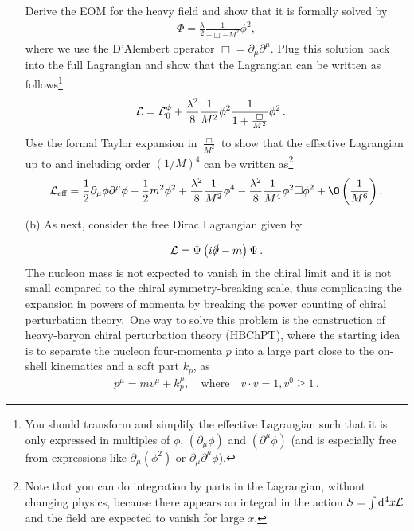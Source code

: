 \documentclass[11pt]{latex/exercise}
\begin{document}
\begin{itemize}
          Derive the EOM for the heavy field and show that it is formally solved by
          \begin{gather}
              \Phi=\frac{\lambda}{2}\frac{1}{-\Box -M^2}\phi^2,
              \label{eq:formal_sol}
          \end{gather}
          where we use the D'Alembert operator $\Box=\partial_{\mu}\partial^{\mu}$.
          Plug this solution back into the full Lagrangian and show that the Lagrangian can be written as follows\footnote{You should transform and simplify the effective Lagrangian such that it is only expressed in multiples of $\phi$, $(\partial_{\mu}\phi)$ and $(\partial^{\mu}\phi)$
              (and is especially free from expressions like $\partial_{\mu}(\phi^2)$ or $\partial_{\mu}\partial^{\mu}\phi$).}
          \begin{align}
              \mathcal{L} & =\mathcal{L}_0^{\phi}+\frac{\lambda^2}{8}\frac{1}{M^2}\phi^2 \frac{1}{1+\frac{\Box}{M^2}}\phi^2
              \,.
          \end{align}
          Use the formal Taylor expansion in $\frac{\Box}{M^2}$ to show that the effective Lagrangian up to and including order $(1/M)^4$ can be written as\footnote{Note that you can do integration by parts in the Lagrangian, without changing physics, because there appears an integral in the action $S=\int\mathrm{d}^ 4 x \mathcal{L}$ and the field are expected to vanish for large $x$.}
          \begin{gather}
              \L_{\text{eff}}=
              \frac{1}{2}\partial_{\mu}\phi\partial^{\mu}\phi
              -\frac{1}{2}m^2\phi^2
              +\frac{\lambda^2}{8}\frac{1}{M^2}\phi^4
              -\frac{\lambda^2}{8}\frac{1}{M^4}\phi^2 \Box \phi^2
              +\O\left(\frac{1}{M^6}\right).
          \end{gather}

    \item[(b)]As next, consider the free Dirac Lagrangian given by

          \begin{eqnarray}
              \mathcal{L} = \bar \Psi \left( i \slashed{\partial}  - m \right) \Psi
              \,.
          \end{eqnarray}
          The nucleon mass is not expected to vanish in the chiral limit and it is not small compared to the chiral symmetry-breaking scale, thus complicating the expansion in powers of momenta by breaking the power counting of chiral perturbation theory.~One way to solve this problem is the construction of heavy-baryon chiral perturbation theory (HBChPT), where the starting idea is to separate the nucleon four-momenta $p$ into a large part close to the on-shell kinematics and a soft part $k_p$, as
          \begin{gather}
              p^{\mu}=m v^{\mu} + k_p^{\mu},\quad \text{where}\quad v\cdot v=1, v^0\geq 1\,.
          \end{gather}


\end{itemize}
\end{document}
